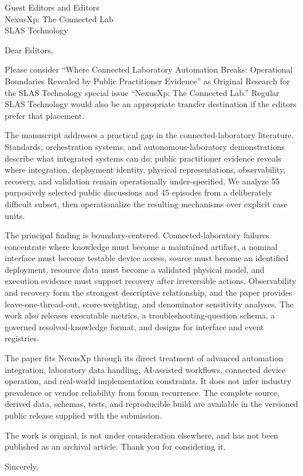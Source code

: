 \documentclass[10pt]{letter}
\begin{document}
\begin{letter}{Guest Editors and Editors\\NexusXp: The Connected Lab\\SLAS Technology}
\opening{Dear Editors,}

Please consider ``Where Connected Laboratory Automation Breaks: Operational Boundaries Revealed by Public Practitioner Evidence'' as Original Research for the SLAS Technology special issue ``NexusXp: The Connected Lab.'' Regular SLAS Technology would also be an appropriate transfer destination if the editors prefer that placement.

The manuscript addresses a practical gap in the connected-laboratory literature. Standards, orchestration systems, and autonomous-laboratory demonstrations describe what integrated systems can do; public practitioner evidence reveals where integration, deployment identity, physical representations, observability, recovery, and validation remain operationally under-specified. We analyze 55 purposively selected public discussions and 45 episodes from a deliberately difficult subset, then operationalize the resulting mechanisms over explicit case units.

The principal finding is boundary-centered. Connected-laboratory failures concentrate where knowledge must become a maintained artifact, a nominal interface must become testable device access, source must become an identified deployment, resource data must become a validated physical model, and execution evidence must support recovery after irreversible actions. Observability and recovery form the strongest descriptive relationship, and the paper provides leave-one-thread-out, score-weighting, and denominator sensitivity analyses. The work also releases executable metrics, a troubleshooting-question schema, a governed resolved-knowledge format, and designs for interface and event registries.

The paper fits NexusXp through its direct treatment of advanced automation integration, laboratory data handling, AI-assisted workflows, connected device operation, and real-world implementation constraints. It does not infer industry prevalence or vendor reliability from forum recurrence. The complete source, derived data, schemas, tests, and reproducible build are available in the versioned public release supplied with the submission.

The work is original, is not under consideration elsewhere, and has not been published as an archival article. Thank you for considering it.

\closing{Sincerely,}
\end{letter}
\end{document}
